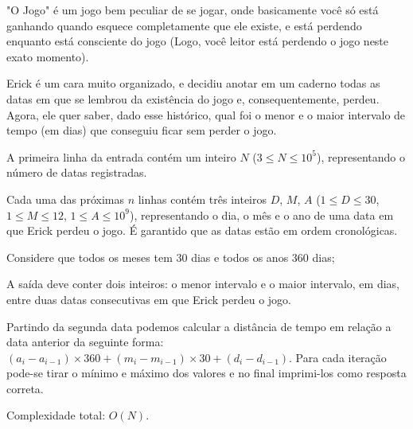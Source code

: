 "O Jogo" é um jogo bem peculiar de se jogar, onde basicamente você só está ganhando quando esquece completamente que ele existe, e está perdendo enquanto está consciente do jogo (Logo, você leitor está perdendo o jogo neste exato momento).  

Erick é um cara muito organizado, e decidiu anotar em um caderno todas as datas em que se lembrou da existência do jogo e, consequentemente, perdeu. Agora, ele quer saber, dado esse histórico, qual foi o menor e o maior intervalo de tempo (em dias) que conseguiu ficar sem perder o jogo.

A primeira linha da entrada contém um inteiro $N$ ($3 \leq N \leq 10^5$), representando o número de datas registradas.  

Cada uma das próximas $n$ linhas contém três inteiros $D$, $M$, $A$ ($1 \leq D \leq 30$, $1 \leq M \leq 12$, $1 \leq A \leq 10^9$), representando o dia, o mês e o ano de uma data em que Erick perdeu o jogo. É garantido que as datas estão em ordem cronológicas.

Considere que todos os meses tem $30$ dias e todos os anos $360$ dias;

A saída deve conter dois inteiros: o menor intervalo e o maior intervalo, em dias, entre duas datas consecutivas em que Erick perdeu o jogo.

Partindo da segunda data podemos calcular a distância de tempo em relação a data anterior da seguinte forma: $(a_i - a_{i-1}) \times 360 + (m_i - m_{i-1}) \times 30 + (d_i - d_{i-1})$.
Para cada iteração pode-se tirar o mínimo e máximo dos valores e no final imprimi-los como resposta correta.

Complexidade total: $O(N)$.

